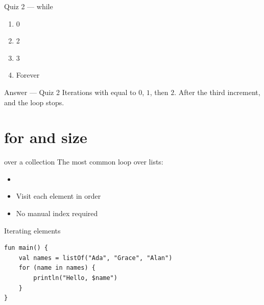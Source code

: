 \documentclass[aspectratio=169,11pt]{beamer}
\begin{document}
    \begin{frame}{Quiz 2 --- while}
        \begin{enumerate}
            \item 0
            \item 2
            \item 3
            \item Forever
        \end{enumerate}
        \quizpause
    \end{frame}

    \begin{frame}{Answer --- Quiz 2}
        \vspace{0.4em}
        Iterations with  equal to $0$, $1$, then $2$.
        After the third increment,  and the loop stops.
    \end{frame}

    \section{for and size}

    \begin{frame}{ over a collection}
        The most common loop over lists:
        \vspace{0.4em}
        \begin{itemize}
            \item {}
            \item Visit each element in order
            \item No manual index required
        \end{itemize}
    \end{frame}

    \begin{frame}[fragile]{Iterating elements}
        \begin{lstlisting}
fun main() {
    val names = listOf("Ada", "Grace", "Alan")
    for (name in names) {
        println("Hello, $name")
    }
}
        \end{lstlisting}
    \end{frame}
\end{document}
